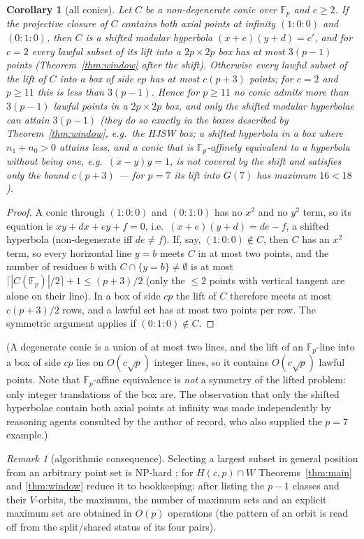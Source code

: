 \documentclass[11pt]{article}
\newtheorem{corollary}[theorem]{Corollary}
\theoremstyle{remark}
\newtheorem{remark}[theorem]{Remark}
\newcommand{\Fp}{\mathbb{F}_p}
\newcommand{\Hc}{H(c,p)}
\begin{document}
\begin{corollary}[all conics]\label{cor:conics}
Let $C$ be a non-degenerate conic over $\Fp$ and $c\ge2$.  If the projective closure of $C$ contains both axial points at infinity
$(1{:}0{:}0)$ and $(0{:}1{:}0)$, then $C$ is a shifted modular hyperbola $(x+e)(y+d)=c'$, and for $c=2$ every lawful subset of its
lift into a $2p\times2p$ box has at most $3(p-1)$ points (Theorem~\ref{thm:window} after the shift).  Otherwise every lawful subset
of the lift of $C$ into a box of side $cp$ has at most $c(p+3)$ points; for $c=2$ and $p\ge11$ this is less than $3(p-1)$.  Hence
for $p\ge11$ no conic admits more than $3(p-1)$ lawful points in a $2p\times2p$ box, and only the shifted modular hyperbolae can
attain $3(p-1)$ (they do so exactly in the boxes described by Theorem~\ref{thm:window}, e.g.\ the HJSW box; a shifted hyperbola in
a box where $n_1+n_0>0$ attains less, and a conic that is $\Fp$-affinely equivalent to a hyperbola without being one, e.g.\
$(x-y)y=1$, is not covered by the shift and satisfies only the bound $c(p+3)$ --- for $p=7$ its lift into $G(7)$ has maximum $16<18$).
\end{corollary}
\begin{proof}
A conic through $(1{:}0{:}0)$ and $(0{:}1{:}0)$ has no $x^2$ and no $y^2$ term, so its equation is $xy+dx+ey+f=0$, i.e.\
$(x+e)(y+d)=de-f$, a shifted hyperbola (non-degenerate iff $de\ne f$).  If, say, $(1{:}0{:}0)\notin C$, then $C$ has an $x^2$ term,
so every horizontal line $y=b$ meets $C$ in at most two points, and the number of residues $b$ with $C\cap\{y=b\}\ne\emptyset$ is
at most $\lceil|C(\Fp)|/2\rceil+1\le(p+3)/2$ (only the $\le2$ points with vertical tangent are alone on their line).  In a box of
side $cp$ the lift of $C$ therefore meets at most $c(p+3)/2$ rows, and a lawful set has at most two points per row.  The
symmetric argument applies if $(0{:}1{:}0)\notin C$.
\end{proof}
(A degenerate conic is a union of at most two lines, and the lift of an $\Fp$-line into a box of side $cp$ lies on $O(c\sqrt p)$
integer lines, so it contains $O(c\sqrt p)$ lawful points.  Note that $\Fp$-affine equivalence is \emph{not} a symmetry of the
lifted problem: only integer translations of the box are.  The observation that only the shifted hyperbolae contain both axial
points at infinity was made independently by reasoning agents consulted by the author of record, who also supplied the $p=7$
example.)

\begin{remark}[algorithmic consequence]
Selecting a largest subset in general position from an arbitrary point set is NP-hard \cite{FKNN17}; for
$\Hc\cap W$ Theorems~\ref{thm:main} and \ref{thm:window} reduce it to bookkeeping: after listing the $p-1$ classes and their
$V$-orbits, the maximum, the number of maximum sets and an explicit maximum set are obtained in $O(p)$ operations (the
pattern of an orbit is read off from the split/shared status of its four pairs).
\end{remark}
\end{document}
